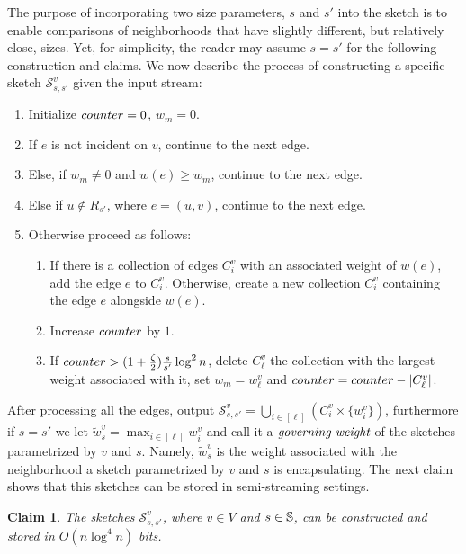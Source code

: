 \documentclass{article}
\newtheorem{claim}[theorem]{Claim}
\newcommand{\Sk}{{\mathcal{S}}}
\begin{document}
The purpose of incorporating two size parameters, $s$ and $s'$ into the sketch is to enable comparisons of neighborhoods that have slightly different, but relatively close, sizes. Yet, for simplicity, the reader may assume $s=s'$ for the following construction and claims. 
We now describe the process of constructing a specific sketch $\Sk^{v}_{s,s'}$ given the input stream: 
\begin{enumerate}
    \item Initialize $counter=0$, \(w_{m} = 0\).
    \item If \(e\) is not incident on \(v\), continue to the next edge. 
    \item Else, if \(w_{m} \neq 0\) and \(w(e) \ge w_{m}\), continue to the next edge. 

    \item Else if $u\notin R_{s'}$, where $e=(u,v)$, continue to the next edge. 

    \item Otherwise proceed as follows:
    \begin{enumerate}
        \item If there is a collection of edges \(C_i^v\) with an associated weight of \(w(e)\), add the edge \(e\) to \(C_i^v\). Otherwise, create a new collection \(C_i^v\) containing the edge \(e\) alongside \(w(e)\).

        \item Increase $counter$ by $1$.

        \item If $counter > (1+\frac{\zeta}{2}) \frac{s}{s'} \log^2 n$, delete $C_\ell^v$ the collection with the largest weight associated with it, set $w_{m}=w^v_\ell$ and $counter = counter - \left|C_\ell^v\right|$.
    \end{enumerate}
\end{enumerate}


After processing all the edges, output \({\Sk}^{v}_{s,s'} = \bigcup_{i \in [\ell]} (C_i^v \times \{w^v_i\})\), furthermore if $s=s'$ we let \(\tilde{w}^v_s = \max_{i \in [\ell]} w^v_i\) and call it a $\emph{governing weight}$ of the sketches parametrized by $v$ and $s$. Namely, $\tilde{w}^v_s$ is the weight associated with the neighborhood a sketch parametrized by $v$ and $s$ is encapsulating. The next claim shows that this sketches can be stored in semi-streaming settings.

\begin{claim}
\label{clm:sketch2size}
The sketches \({\Sk}^{v}_{s,s'}\), where  \(v \in V\) and \(s \in \mathbb{S}\), can be constructed and stored in \(O(n \log^4 n)\) bits. 
\end{claim}
\end{document}
